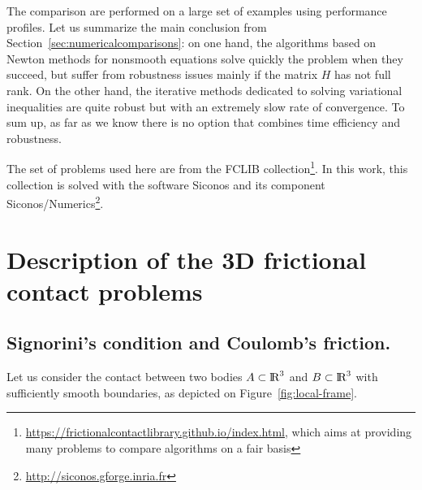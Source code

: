 The comparison are performed on a large set of examples using performance profiles.
{Let us summarize the main conclusion from Section~\ref{sec:numericalcomparisons}:
on one hand}, the algorithms based on Newton methods for nonsmooth equations solve quickly the problem when they succeed, but suffer from robustness issues mainly if the matrix $H$ has not full rank. On the other hand, the
iterative methods dedicated to solving variational inequalities are quite robust but with an extremely slow rate of convergence. To sum up, as far as we know there is no option that combines time efficiency and robustness.
{The set of problems used here are from the FCLIB collection\footnote{\url{https://frictionalcontactlibrary.github.io/index.html}, which aims at providing many problems to compare algorithms on a fair basis}.  In this work, this collection is solved with the software {\sc Siconos} and its component {\sc Siconos/Numerics}\footnote{\url{http://siconos.gforge.inria.fr}}\citep{Acary.Bremond.Huber.Perignon2015}.

\section{Description of the 3D frictional contact problems}
\label{sec:description}
\subsection{Signorini's condition and Coulomb's friction.}

Let us consider the contact between two  bodies $A \subset  \mbox{l\hspace{ -.15em}R}^3$ and $B \subset \mbox{l\hspace{ -.15em}R}^3$ with sufficiently smooth boundaries, as depicted on Figure~\ref{fig:local-frame}.
\begin{figure}[htb]
  \centering
\end{figure}}
